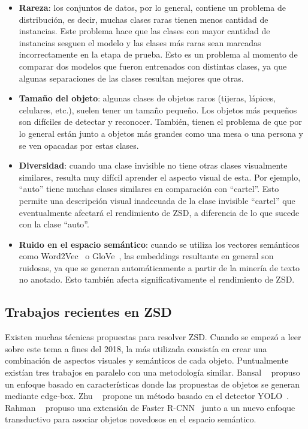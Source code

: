 \begin{itemize}
	\item \textbf{Rareza}: los conjuntos de datos, por lo general, contiene un problema de distribución, es decir, muchas clases raras tienen menos cantidad de instancias. Este problema hace que las clases con mayor cantidad de instancias sesguen el modelo y las clases más raras sean marcadas incorrectamente en la etapa de prueba. Esto es un problema al momento de comparar dos modelos que fueron entrenados con distintas clases, ya que algunas separaciones de las clases resultan mejores que otras.
	
	\item \textbf{Tamaño del objeto}: algunas clases de objetos raros (tijeras, lápices, celulares, etc.), suelen tener un tamaño pequeño. Los objetos más pequeños son difíciles de detectar y reconocer. También, tienen el problema de que por lo general están junto a objetos más grandes como una mesa o una persona y se ven opacadas por estas clases.
	
	\item \textbf{Diversidad}: cuando una clase invisible no tiene otras clases visualmente similares, resulta muy difícil aprender el aspecto visual de esta. Por ejemplo, ``auto'' tiene muchas clases similares en comparación con ``cartel''. Esto permite una descripción visual inadecuada de la clase invisible ``cartel'' que eventualmente afectará el rendimiento de ZSD, a diferencia de lo que sucede con la clase ``auto''.
	
	\item \textbf{Ruido en el espacio semántico}: cuando se utiliza los vectores semánticos como Word2Vec~\cite{mikolov2013distributed} o GloVe~\cite{pennington2014glove}, las embeddings resultante en general son ruidosas, ya que se generan automáticamente a partir de la minería de texto no anotado. Esto también afecta significativamente el rendimiento de ZSD.
\end{itemize}

\subsection{Trabajos recientes en ZSD} \label{ssec:trabajosrecientesenzsd}

Existen muchas técnicas propuestas para resolver ZSD. Cuando se empezó a leer sobre este tema a fines del 2018, la más utilizada consistía en crear una combinación de aspectos visuales y semánticos de cada objeto. Puntualmente existían tres trabajos en paralelo con una metodología similar. Bansal \etal~\cite{bansal2018zero} propuso un enfoque basado en características donde las propuestas de objetos se generan mediante edge-box. Zhu \etal~\cite{zhu2018zero} propone un método basado en el detector YOLO~\cite{redmon2016you}. Rahman \etal~\cite{rahman2018zero} propuso una extensión de Faster R-CNN~\cite{ren2015faster} junto a un nuevo enfoque transductivo para asociar objetos novedosos en el espacio semántico.\\


